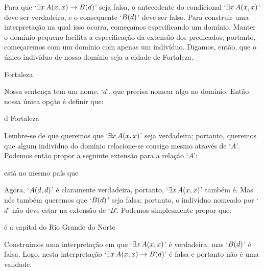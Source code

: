 Para que `$\exists x\,\mathord{A}(x,x) \rightarrow \mathord{B}(d)$' seja falsa, o antecedente do condicional `$\exists x\, \mathord{A}(x,x)$' deve ser verdadeiro, e o consequente `$\mathord{B}(d)$' deve ser falso.
Para construir uma interpretação na qual isso ocorra, começamos especificando um domínio.
Manter o domínio pequeno facilita a especificação da extensão dos predicados; portanto, começaremos com um domínio com apenas um indivíduo.
Digamos, então, que o único indivíduo de nosso domínio seja a cidade de Fortaleza.
\begin{center}
	\begin{ekey}
		\item[\text{domínio}] Fortaleza
	\end{ekey}
\end{center}
Nossa sentença tem um nome, `$d$', que precisa nomear algo no domínio.
Então nossa única opção é definir que:
\begin{center}
	\begin{ekey}
		\item[d] Fortaleza
	\end{ekey}
\end{center}
Lembre-se de que queremos que `$\exists x\, \mathord{A}(x,x)$' seja verdadeira; portanto, queremos que algum indivíduo do domínio relacione-se consigo mesmo através de `$A$'.
Podemos então propor a seguinte extensão para a relação `$A$':
\begin{center}
	\begin{ekey}
		\item[\atom{A}{x,y}]  está no mesmo país que 
	\end{ekey}
\end{center}
Agora, `$\mathord{A}(d,d)$' é claramente verdadeira, portanto, `$\exists x\, \mathord{A}(x,x)$' também é. 
Mas nós também queremos que `$\mathord{B}(d)$' seja falsa; portanto, o indivíduo nomeado por `$d$' não deve estar na extensão de `$B$'.
Podemos simplesmente propor que:
\begin{center}
	\begin{ekey}
		\item[\atom{B}{x}]  é a capital do Rio Grande do Norte
	\end{ekey}
\end{center}
Construímos uma interpretação em que `$\exists x\, \mathord{A}(x,x)$' é verdadeira, mas `$\mathord{B}(d)$' é falsa.
Logo, nesta interpretação `$\exists x\, \mathord{A}(x,x) \rightarrow \mathord{B}(d)$' é falsa e portanto não é uma validade.

